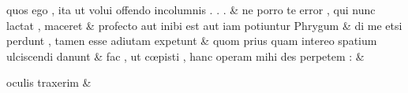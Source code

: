 \documentclass[12pt,onecolumn,twoside,a4paper]{memoir}
\begin{document}
\begin{pairs}
\begin{Leftside}
                              quos
                              ego
                              ,
                              ita
                              ut
                              volui
                              offendo
                              incolumnis
                              .
                              .
                              . \&
                         \stanza {}
                     ne
                              porro
                              te
                              error
                              ,
                              qui
                              nunc
                              lactat
                              ,
                              maceret \&
                         \stanza {}
                     profecto
                              aut
                              inibi
                              est
                              aut
                              iam
                              potiuntur
                              Phrygum \&
                         \stanza {}di
                              me
                              etsi
                              perdunt
                              ,
                              tamen
                              esse
                              adiutam
                              expetunt & 
                     quom
                              prius
                              quam
                              intereo
                              spatium
                              ulciscendi
                              danunt \&
                         \stanza {}
                              fac
                              ,
                              ut
                              cœpisti
                              ,
                              hanc
                              operam
                              mihi
                              des
                              perpetem
                              : & 
                     
                              oculis
                              traxerim \&
                         \stanza {}
                     

\end{Leftside}
\end{pairs}
\end{document}
